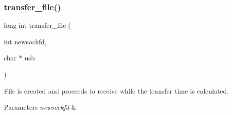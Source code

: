 \subsubsection{transfer\+\_\+file()}
{\footnotesize\ttfamily long int transfer\+\_\+file (\begin{DoxyParamCaption}\item[{int}]{newsockfd,  }\item[{char $\ast$}]{usb }\end{DoxyParamCaption})}



File is created and proceeds to receive while the transfer time is calculated. 


\begin{DoxyParams}{Parameters}
{\em newsockfd} & \\
\hline
\end{DoxyParams}

